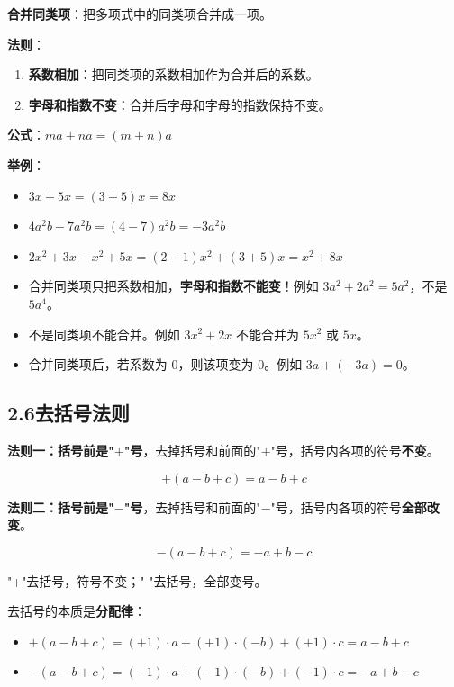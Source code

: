 \documentclass[12pt, a4paper]{ctexart}
\begin{document}
\begin{knowledgebox}[合并同类项法则]
\textbf{合并同类项}：把多项式中的同类项合并成一项。

\textbf{法则}：
\begin{enumerate}[leftmargin=*]
  \item \textbf{系数相加}：把同类项的系数相加作为合并后的系数。
  \item \textbf{字母和指数不变}：合并后字母和字母的指数保持不变。
\end{enumerate}

\textbf{公式}：$ma + na = (m+n)a$

\textbf{举例}：
\begin{itemize}[leftmargin=*]
  \item $3x + 5x = (3+5)x = 8x$
  \item $4a^2b - 7a^2b = (4-7)a^2b = -3a^2b$
  \item $2x^2 + 3x - x^2 + 5x = (2-1)x^2 + (3+5)x = x^2 + 8x$
\end{itemize}
\end{knowledgebox}

\begin{warnbox}[易错提醒]
\begin{itemize}[leftmargin=*]
  \item 合并同类项只把系数相加，\textbf{字母和指数不能变}！例如 $3a^2 + 2a^2 = 5a^2$，不是 $5a^4$。
  \item 不是同类项不能合并。例如 $3x^2 + 2x$ 不能合并为 $5x^2$ 或 $5x$。
  \item 合并同类项后，若系数为 $0$，则该项变为 $0$。例如 $3a + (-3a) = 0$。
\end{itemize}
\end{warnbox}

\subsection*{2.6\quad 去括号法则}

\begin{knowledgebox}[去括号法则]
\textbf{法则一：括号前是"$+$"号}，去掉括号和前面的"$+$"号，括号内各项的符号\textbf{不变}。

\[
+(a - b + c) = a - b + c
\]

\textbf{法则二：括号前是"$-$"号}，去掉括号和前面的"$-$"号，括号内各项的符号\textbf{全部改变}。

\[
-(a - b + c) = -a + b - c
\]
\end{knowledgebox}

\begin{tipbox}[去括号的口诀]
"+"去括号，符号不变；"-"去括号，全部变号。

去括号的本质是\textbf{分配律}：
\begin{itemize}[leftmargin=*]
  \item $+(a - b + c) = (+1) \cdot a + (+1) \cdot (-b) + (+1) \cdot c = a - b + c$
  \item $-(a - b + c) = (-1) \cdot a + (-1) \cdot (-b) + (-1) \cdot c = -a + b - c$
\end{itemize}
\end{tipbox}
\end{document}
